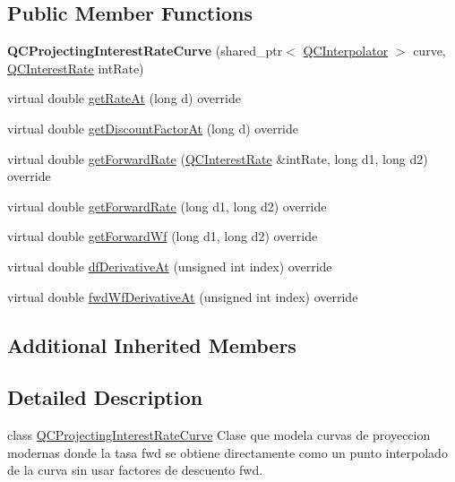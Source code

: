\subsection*{Public Member Functions}
\begin{DoxyCompactItemize}
\item 
\hypertarget{class_q_c_projecting_interest_rate_curve_a0f1053cb9509354040a90c68b098f570}{{\bfseries Q\+C\+Projecting\+Interest\+Rate\+Curve} (shared\+\_\+ptr$<$ \hyperlink{class_q_c_interpolator}{Q\+C\+Interpolator} $>$ curve, \hyperlink{class_q_c_interest_rate}{Q\+C\+Interest\+Rate} int\+Rate)}\label{class_q_c_projecting_interest_rate_curve_a0f1053cb9509354040a90c68b098f570}

\item 
virtual double \hyperlink{class_q_c_projecting_interest_rate_curve_af2f420b0178d8a86b67e9d800ec96c8e}{get\+Rate\+At} (long d) override
\item 
virtual double \hyperlink{class_q_c_projecting_interest_rate_curve_a777da5100b3dd412e9764c6129c6715b}{get\+Discount\+Factor\+At} (long d) override
\item 
virtual double \hyperlink{class_q_c_projecting_interest_rate_curve_a2f01098cb4e3c2ba6163fb9bef4a6b66}{get\+Forward\+Rate} (\hyperlink{class_q_c_interest_rate}{Q\+C\+Interest\+Rate} \&int\+Rate, long d1, long d2) override
\item 
virtual double \hyperlink{class_q_c_projecting_interest_rate_curve_a07a0b96ca283abb7f3e0a79432bcdee9}{get\+Forward\+Rate} (long d1, long d2) override
\item 
virtual double \hyperlink{class_q_c_projecting_interest_rate_curve_af58caeb654c8b7623716997d39e96045}{get\+Forward\+Wf} (long d1, long d2) override
\item 
virtual double \hyperlink{class_q_c_projecting_interest_rate_curve_aa32b5f4d4bea4565e3610bda00ed8d06}{df\+Derivative\+At} (unsigned int index) override
\item 
virtual double \hyperlink{class_q_c_projecting_interest_rate_curve_ad6b67e23665886cdcf91957fe12e10d8}{fwd\+Wf\+Derivative\+At} (unsigned int index) override
\end{DoxyCompactItemize}
\subsection*{Additional Inherited Members}


\subsection{Detailed Description}
class \hyperlink{class_q_c_projecting_interest_rate_curve}{Q\+C\+Projecting\+Interest\+Rate\+Curve} Clase que modela curvas de proyeccion modernas donde la tasa fwd se obtiene directamente como un punto interpolado de la curva sin usar factores de descuento fwd. 

